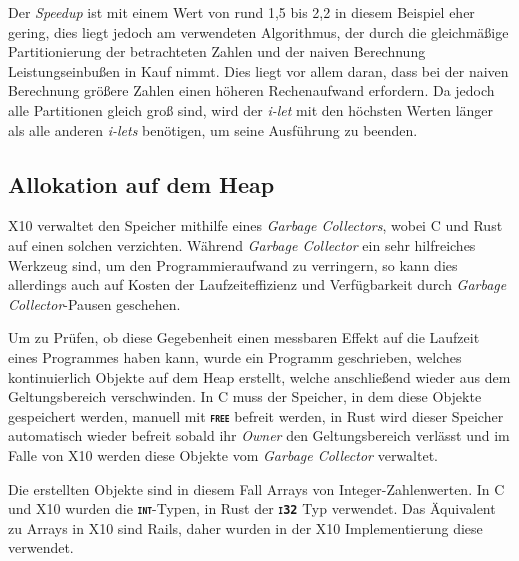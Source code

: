 Der \textit{Speedup} ist mit einem Wert von rund 1,5 bis 2,2 in diesem Beispiel eher gering,
dies liegt jedoch am verwendeten Algorithmus,
der durch die gleichmäßige Partitionierung der betrachteten Zahlen und der naiven Berechnung
Leistungseinbußen in Kauf nimmt. Dies liegt vor allem daran, dass bei der naiven Berechnung größere Zahlen
einen höheren Rechenaufwand erfordern. Da jedoch alle Partitionen gleich groß sind, wird der \textit{i-let} mit
den höchsten Werten länger als alle anderen \textit{i-lets} benötigen, um seine Ausführung zu beenden.

\subsection{Allokation auf dem Heap}

X10 verwaltet den Speicher mithilfe eines \textit{Garbage Collectors}, wobei C und Rust auf einen solchen verzichten.
Während \textit{Garbage Collector} ein sehr hilfreiches Werkzeug sind,
um den Programmieraufwand zu verringern, so kann dies
allerdings auch auf Kosten der Laufzeiteffizienz und Verfügbarkeit durch \textit{Garbage Collector}-Pausen geschehen.

Um zu Prüfen, ob diese Gegebenheit einen messbaren Effekt auf die Laufzeit eines Programmes haben kann,
wurde ein Programm geschrieben, welches kontinuierlich Objekte auf dem Heap erstellt,
welche anschließend wieder aus dem Geltungsbereich verschwinden.
In C muss der Speicher, in dem diese Objekte gespeichert werden, manuell mit \texttt{\textsc{\textbf{free}}}
befreit werden, in Rust wird dieser Speicher automatisch wieder befreit sobald ihr \textit{Owner} den
Geltungsbereich verlässt und im Falle von X10 werden diese Objekte vom \textit{Garbage Collector} verwaltet.

Die erstellten Objekte sind in diesem Fall Arrays von Integer-Zahlenwerten. In C und X10 wurden die
\texttt{\textsc{\textbf{int}}}-Typen, in Rust der \texttt{\textsc{\textbf{i32}}} Typ verwendet. 
Das Äquivalent zu Arrays in X10 sind Rails, daher wurden in der X10 Implementierung diese verwendet.

